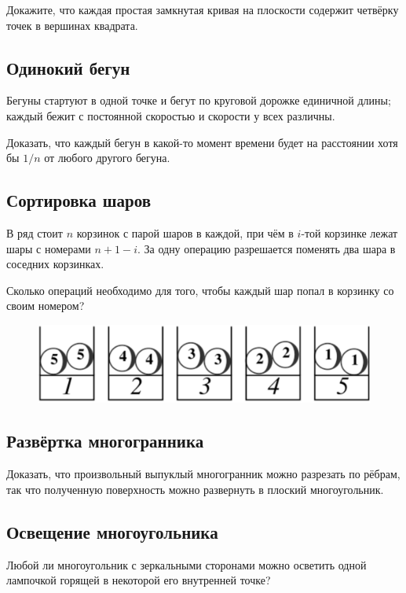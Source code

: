Докажите, что каждая простая замкнутая кривая на плоскости содержит четвёрку точек в вершинах квадрата.

\subsection*{Одинокий бегун}

Бегуны  стартуют в одной точке и бегут по круговой дорожке единичной длины;
каждый бежит с постоянной скоростью и скорости у всех различны.

Доказать, что каждый бегун в какой-то момент времени будет на расстоянии хотя бы $1/n$ от любого другого бегуна.

\subsection*{Сортировка шаров}

В ряд стоит $n$ корзинок с парой шаров в каждой, при чём в $i$-той корзинке лежат шары с номерами $n+1-i$.
За одну операцию разрешается поменять два шара в соседних корзинках.

Сколько операций необходимо для того, чтобы каждый шар попал в корзинку со своим номером?

\begin{figure}[h!]
\centering
\includegraphics[scale=0.5]{Figs/UnsolvedPuzzles/bins}
\end{figure}

\subsection*{Развёртка многогранника}

Доказать, что произвольный выпуклый многогранник можно разрезать по рёбрам, так что полученную поверхность можно развернуть в плоский многоугольник.

\subsection*{Освещение многоугольника}

Любой ли многоугольник с зеркальными сторонами можно осветить одной лампочкой горящей в некоторой его внутренней точке?


